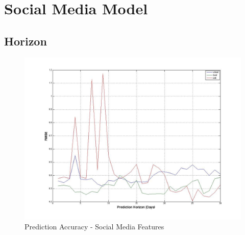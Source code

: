 \clearpage

\section{Social Media Model}






\subsection{Horizon}




\begin{figure}[H]
        \centering
         \includegraphics[width=1\textwidth ]{img/model/exp2/result}      
        \caption{Prediction Accuracy - Social Media Features }
        \label{fig:gnn_fuzz}
\end{figure}






